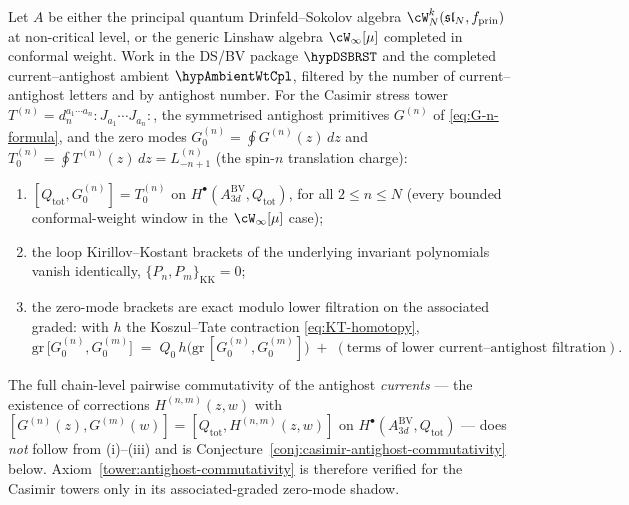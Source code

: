 \begin{theorem}
\label{thm:casimir-antighost-commutativity}
\label{rem:antighost-BRST-commutativity}%
Let $A$ be either the principal quantum Drinfeld--Sokolov algebra
$\cW_N^k(\mathfrak{sl}_N,f_{\mathrm{prin}})$ at non-critical level, or
the generic Linshaw algebra $\cW_\infty[\mu]$ completed in conformal
weight. Work in the DS/BV package \(\hypDSBRST\) and the completed
current--antighost ambient \(\hypAmbientWtCpl\), filtered by the
number of current--antighost letters and by antighost number. For the
Casimir stress tower
$T^{(n)}=d_n^{a_1\cdots a_n}{:}J_{a_1}\cdots J_{a_n}{:}$, the
symmetrised antighost primitives $G^{(n)}$ of
\eqref{eq:G-n-formula}, and the zero modes
$G^{(n)}_0=\oint G^{(n)}(z)\,dz$ and
$T^{(n)}_0=\oint T^{(n)}(z)\,dz=L^{(n)}_{-n+1}$ (the spin-$n$
translation charge):
\begin{enumerate}[label=\textup{(\roman*)}]
\item $[Q_{\mathrm{tot}},G^{(n)}_0]=T^{(n)}_0$ on
 $H^\bullet(A^{\mathrm{BV}}_{3d},Q_{\mathrm{tot}})$, for all
 $2\le n\le N$ (every bounded conformal-weight window in the
 $\cW_\infty[\mu]$ case);
\item the loop Kirillov--Kostant brackets of the underlying invariant
 polynomials vanish identically,
 $\{P_n,P_m\}_{\mathrm{KK}}=0$;
\item the zero-mode brackets are exact modulo lower filtration on the
 associated graded: with $h$ the Koszul--Tate contraction
 \eqref{eq:KT-homotopy},
\begin{equation}\label{eq:casimir-antighost-commute}
\mathrm{gr}\,\bigl[G^{(n)}_0,G^{(m)}_0\bigr]
\;=\;
Q_0\,h\bigl(\mathrm{gr}\,[G^{(n)}_0,G^{(m)}_0]\bigr)
\;+\;(\text{terms of lower current--antighost filtration}).
\end{equation}
\end{enumerate}
The full chain-level pairwise commutativity of the antighost
\emph{currents} --- the existence of corrections $H^{(n,m)}(z,w)$
with $[G^{(n)}(z),G^{(m)}(w)]=[Q_{\mathrm{tot}},H^{(n,m)}(z,w)]$ on
$H^\bullet(A^{\mathrm{BV}}_{3d},Q_{\mathrm{tot}})$ --- does
\emph{not} follow from \textup{(i)--(iii)} and is
Conjecture~\ref{conj:casimir-antighost-commutativity} below.
Axiom~\ref{tower:antighost-commutativity} is therefore verified for
the Casimir towers only in its associated-graded zero-mode shadow.
\end{theorem}

